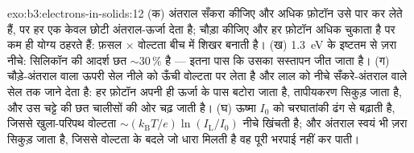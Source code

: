 \begin{solution}{exo:b3:electrons-in-solids:12}
(क) अंतराल सँकरा कीजिए और अधिक फ़ोटॉन उसे पार कर लेते हैं, पर हर एक
केवल छोटी अंतराल-ऊर्जा देता है; चौड़ा कीजिए और हर फ़ोटॉन अधिक चुकाता
है पर कम ही योग्य ठहरते हैं: फ़सल $\times$ वोल्टता बीच में शिखर बनाती है।
(ख) \qty{1.3}{eV} के इष्टतम से ज़रा नीचे: सिलिकॉन की आदर्श
छत $\sim30\,\%$ है --- इतना पास कि उसका सस्तापन जीत जाता है।
(ग) चौड़े-अंतराल वाला ऊपरी सेल नीले को ऊँची वोल्टता पर लेता है और
लाल को नीचे सँकरे-अंतराल वाले सेल तक जाने देता है: हर फ़ोटॉन अपनी ही
ऊर्जा के पास बटोरा जाता है, तापीयकरण सिकुड़ जाता है, और उस चट्टे की
छत चालीसों की ओर चढ़ जाती है। (घ) ऊष्मा $I_0$ को
चरघातांकी ढंग से बढ़ाती है, जिससे खुला-परिपथ वोल्टता
$\sim(k_{\text{B}}T/e)\ln(I_{\text{L}}/I_0)$ नीचे खिंचती है; और
अंतराल स्वयं भी ज़रा सिकुड़ जाता है, जिससे वोल्टता के बदले जो धारा
मिलती है वह पूरी भरपाई नहीं कर पाती।
\end{solution}

